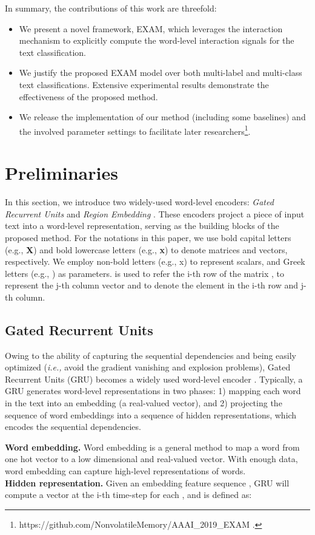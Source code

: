 \documentclass[letterpaper]{article} \usepackage{aaai19}  \usepackage{times}  \usepackage{helvet}  \usepackage{courier}  \usepackage{url}  \usepackage{graphicx}
\newcommand{\ie}{\emph{i.e., }}
\begin{document}
In summary, the contributions of this work are threefold: 
\begin{itemize}
\item  We present a novel framework, EXAM, which leverages the interaction mechanism to explicitly compute the word-level interaction signals for the text classification.
\item We justify the proposed EXAM model over both multi-label and multi-class text classifications. Extensive experimental results demonstrate the effectiveness of the proposed method.
\item We release the implementation of our method (including some baselines) and the involved parameter settings to facilitate later researchers\footnote{https://github.com/NonvolatileMemory/AAAI\_2019\_EXAM .}.
\end{itemize}

\section{Preliminaries}
In this section, we introduce two widely-used word-level encoders: \textit{Gated Recurrent Units} \cite{GRU} and \textit{Region Embedding} \cite{regionemb}. These encoders project a piece of input text into a word-level representation, serving as the building blocks of the proposed method. 
For the notations in this paper,
we use bold capital letters (e.g., \textbf{X}) and bold lowercase letters (e.g., \textbf{x}) to denote matrices and vectors, respectively. We employ non-bold letters (e.g., x) to represent scalars, and Greek letters (e.g.,  ) as parameters.  is used to refer the i-th row of the matrix ,  to represent the j-th column vector and  to denote the element in the i-th row and j-th column. 

\subsection{Gated Recurrent Units} 
Owing to the ability of capturing the sequential dependencies and being easily optimized (\ie avoid the gradient vanishing and explosion problems), Gated Recurrent Units (GRU) becomes a widely used word-level encoder \cite{TextRNN,dlstm}. 
Typically, a GRU generates word-level representations in two phases: 1) mapping each word in the text into an embedding (a real-valued vector), and 2) projecting the sequence of word embeddings into a sequence of hidden representations, which encodes the sequential dependencies.

\noindent \textbf{Word embedding.}
Word embedding is a general method to map a word from one hot vector to a low dimensional and real-valued vector. With enough data, word embedding can capture high-level representations of words.
\\
\textbf{Hidden representation.}
Given an embedding feature sequence , GRU will compute a vector  at the i-th time-step for each , and   is defined as:
\end{document}

